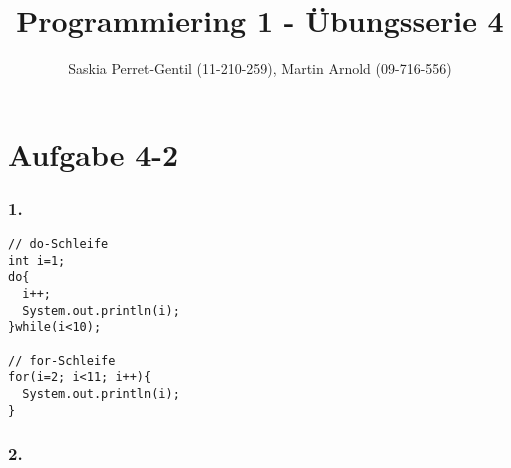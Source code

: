 \documentclass{article}
\begin{document}
\title{Programmiering 1 - Übungsserie 4}
\author{Saskia Perret-Gentil (11-210-259), Martin Arnold (09-716-556)}
\maketitle
\section*{Aufgabe 4-2}

\subsubsection*{1.}
\begin{verbatim}
// do-Schleife
int i=1;
do{
  i++;
  System.out.println(i);
}while(i<10);

// for-Schleife
for(i=2; i<11; i++){
  System.out.println(i);
}
\end{verbatim}

\subsubsection*{2.}
\end{document}

